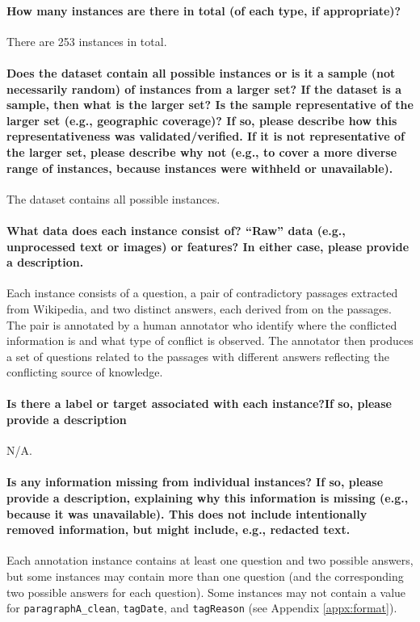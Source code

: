 \documentclass{article}
\begin{document}
\paragraph{How many instances are there in total (of each type, if appropriate)?}
There are 253 instances in total.

\paragraph{Does the dataset contain all possible instances or is it a sample (not necessarily random) of instances from a larger set? If the dataset is a sample, then what is the larger set? Is the sample representative of the larger set (e.g., geographic coverage)? If so, please describe how this representativeness was validated/verified. If it is not representative of the larger set, please describe why not (e.g., to cover a more diverse range of instances, because instances were withheld or unavailable).}
The dataset contains all possible instances.

\paragraph{What data does each instance consist of? ``Raw'' data (e.g., unprocessed text or images) or features? In either case, please provide a description.}
Each instance consists of a question, a pair of contradictory passages extracted from Wikipedia, and two distinct answers, each derived from on the passages. The pair is annotated by a human annotator who identify where the conflicted information is and what type of conflict is observed. The annotator then produces a set of questions related to the passages with different answers reflecting the conflicting source of knowledge.

\paragraph{Is there a label or target associated with each instance?If so, please provide a description}
N/A.

\paragraph{Is any information missing from individual instances? If so, please provide a description, explaining why this information is missing (e.g., because it was unavailable). This does not include intentionally removed information, but might include, e.g., redacted text.}
Each annotation instance contains at least one question and two possible answers, but some instances may contain more than one question (and the corresponding two possible answers for each question). Some instances may not contain a value for \texttt{paragraphA\_clean}, \texttt{tagDate}, and \texttt{tagReason} (see Appendix \ref{appx:format}).
\end{document}
